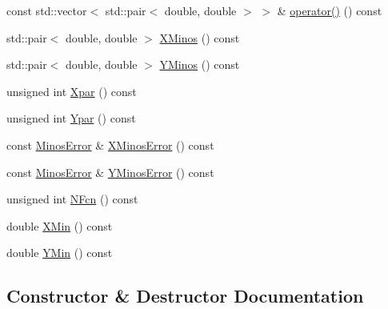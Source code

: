 \begin{DoxyCompactItemize}
\item 
const std\+::vector$<$ std\+::pair$<$ double, double $>$ $>$ \& \mbox{\hyperlink{classROOT_1_1Minuit2_1_1ContoursError_ad73e9dd73b1b7480342dd523e78a8def}{operator()}} () const
\item 
std\+::pair$<$ double, double $>$ \mbox{\hyperlink{classROOT_1_1Minuit2_1_1ContoursError_afd1906c6e1b9ddd74363df072590183f}{X\+Minos}} () const
\item 
std\+::pair$<$ double, double $>$ \mbox{\hyperlink{classROOT_1_1Minuit2_1_1ContoursError_a181d8326a32d95dd0f619bcb63076c00}{Y\+Minos}} () const
\item 
unsigned int \mbox{\hyperlink{classROOT_1_1Minuit2_1_1ContoursError_a4f04b22b326b30c5a1bf3c0435544e8d}{Xpar}} () const
\item 
unsigned int \mbox{\hyperlink{classROOT_1_1Minuit2_1_1ContoursError_a3d118d7b9c49e6835130e0ce50b94b18}{Ypar}} () const
\item 
const \mbox{\hyperlink{classROOT_1_1Minuit2_1_1MinosError}{Minos\+Error}} \& \mbox{\hyperlink{classROOT_1_1Minuit2_1_1ContoursError_a0d14fdab181f06ddd1b38e7dc763718b}{X\+Minos\+Error}} () const
\item 
const \mbox{\hyperlink{classROOT_1_1Minuit2_1_1MinosError}{Minos\+Error}} \& \mbox{\hyperlink{classROOT_1_1Minuit2_1_1ContoursError_a7ca7b0f224597473592c8da5a5825d61}{Y\+Minos\+Error}} () const
\item 
unsigned int \mbox{\hyperlink{classROOT_1_1Minuit2_1_1ContoursError_a1342abcb15690e6897ad860e7f05026d}{N\+Fcn}} () const
\item 
double \mbox{\hyperlink{classROOT_1_1Minuit2_1_1ContoursError_ac0dbac1ec08765a632908c88c5f24822}{X\+Min}} () const
\item 
double \mbox{\hyperlink{classROOT_1_1Minuit2_1_1ContoursError_ac2bd4c328fe62d04b2809d9e0730efe3}{Y\+Min}} () const
\end{DoxyCompactItemize}


\subsection{Constructor \& Destructor Documentation}
\mbox{\label{classROOT_1_1Minuit2_1_1ContoursError_abe494ac0098e41bf38fd4023e018e340}} 
